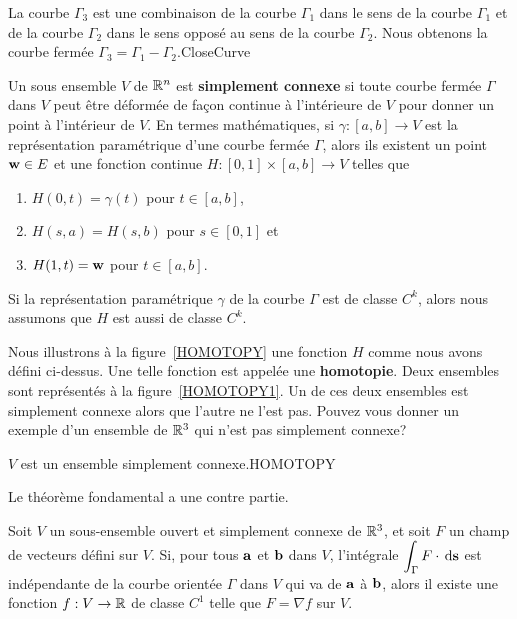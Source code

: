 {
{La courbe $\Gamma_3$ est une combinaison de la courbe $\Gamma_1$
dans le sens de la courbe $\Gamma_1$ et de la courbe $\Gamma_2$
dans le sens opposé au sens de la courbe $\Gamma_2$.  Nous obtenons la
courbe fermée $\Gamma_3 = \Gamma_1 - \Gamma_2$.}{CloseCurve}

\begin{focus}[\theory]{\dfn} 
Un sous ensemble $V$ de $\mathbb{R}^n$ est {\bfseries simplement connexe} si toute
courbe fermée $\Gamma$ dans $V$ peut être déformée de façon continue à
l'intérieure de $V$ pour donner un point à l'intérieur de $V$.  En termes
mathématiques, si $\gamma:[a,b]\rightarrow V$ est la représentation
paramétrique d'une courbe fermée $\Gamma$, alors ils existent un point
$\mathbf{w} \in E$ et une fonction continue $H:[0,1]\times [a,b]\rightarrow V$
telles que
\begin{enumerate}
\item $H(0,t) = \gamma(t)$ pour $t\in [a,b]$,
\item $H(s,a) = H(s,b)$ pour $s\in [0,1]$ et
\item $H(1,t) = \mathbf{w}$ pour $t\in [a,b]$.
\end{enumerate}
Si la représentation paramétrique $\gamma$ de la courbe $\Gamma$ est de
classe $C^k$, alors nous assumons que $H$ est aussi de classe $C^k$.
\end{focus}

Nous illustrons à la figure~\ref{HOMOTOPY} une fonction $H$
comme nous avons défini ci-dessus.  Une telle fonction est appelée une
{\bfseries homotopie}.  Deux ensembles sont
représentés à la figure~\ref{HOMOTOPY1}.  Un de ces deux ensembles est
simplement connexe alors que l'autre ne l'est pas.  Pouvez vous
donner un exemple d'un ensemble de $\mathbb{R}^3$ qui n'est pas simplement
connexe?

{$V$ est un ensemble simplement connexe.}{HOMOTOPY}


Le théorème fondamental a une contre partie.

\begin{focus}{\thm}
Soit $V$ un sous-ensemble ouvert et simplement connexe de $\mathbb{R}^3$, et
soit $F$ un champ de vecteurs défini sur $V$.  Si, pour tous $\mathbf{a}$
et $\mathbf{b}$ dans $V$, l'intégrale
$\displaystyle \int_\Gamma F \cdot \,\mathrm{d}\mathbf{s}$ est
indépendante de la courbe orientée $\Gamma$ dans $V$ qui va de
$\mathbf{a}$ à $\mathbf{b}$, alors il existe une fonction
$f:V\rightarrow \mathbb{R}$ de classe $C^1$ telle que
$F = \nabla f$ sur $V$.
\label{Fnablaf1}
\end{focus}

}

